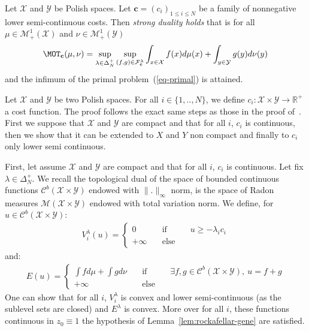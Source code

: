 \begin{thm*}
Let $\mathcal{X}$ and $\mathcal{Y}$ be Polish spaces. Let $\mathbf{c}=(c_i)_{1\leq i\leq N}$ be a family of nonnegative lower semi-continuous costs. Then \emph{strong duality holds} that is for all $\mu\in\mathcal{M}_{+}^{1}(\mathcal{X})$ and $\nu\in\mathcal{M}_{+}^{1}(\mathcal{Y})$ 
\begin{align*}
   \MOT_{\mathbf{c}}(\mu,\nu) =\sup_{\lambda\in\Delta_N^{+}} \sup\limits_{(f,g)\in\mathcal{F}_{\mathbf{c}}^{\lambda}}\int_{x\in\mathcal{X}} f(x)d\mu(x)+ \int_{y\in\mathcal{Y}} g(y)d\nu(y)
\end{align*}
and the infimum of the primal problem~(\ref{eq-primal}) is attained.
\end{thm*}
\begin{prv*}
Let $\mathcal{X}$ and $\mathcal{Y}$ be two Polish spaces. For all $i\in \{1,..,N\}$, we define $c_i:\mathcal{X}\times\mathcal{Y}\rightarrow \mathbb{R}^+$ a cost function. The proof follows the exact same steps as those in the proof of~\citep[Theorem 1.3]{villani2003topics}. First we suppose that $\mathcal{X}$ and $\mathcal{Y}$ are compact and that for all $i$, $c_i$ is continuous, then we show that it can be extended to $X$ and $Y$ non compact and finally to $c_i$ only lower semi continuous.

\medskip
First, let assume $\mathcal{X}$ and $\mathcal{Y}$ are compact and that for all $i$, $c_i$ is continuous. Let fix $\lambda \in\Delta_N^{+}$. We recall the topological dual of the space of bounded continuous functions $\mathcal{C}^b(\mathcal{X}\times\mathcal{Y})$ endowed with $\lVert.\rVert_\infty$ norm, is the space of Radon measures $\mathcal{M}(\mathcal{X}\times\mathcal{Y})$ endowed with total variation norm. We define, for $u\in \mathcal{C}^b(\mathcal{X}\times\mathcal{Y})$:
\begin{align*}
V^\lambda_i(u) =
\left\{\begin{matrix} 0 &\quad\text{if}\quad& u\geq -\lambda_i c_i\\
+\infty &\quad\text{else}\quad&\end{matrix}\right.
\end{align*}
and:
\begin{align*}
E(u)=\left\{\begin{matrix} \int fd\mu+\int gd\nu &\quad\text{if}\quad& \exists f,g\in \mathcal{C}^b(\mathcal{X}\times\mathcal{Y}),~ u = f+g\\
+\infty &\quad\text{else}\quad&\end{matrix}\right.
\end{align*}
One can show that for all $i$, $V^\lambda_i$ is convex and lower semi-continuous (as the sublevel sets are closed) and $E^\lambda$ is convex. More over for all $i$, these functions continuous in $z_0\equiv 1$ the hypothesis of Lemma~\ref{lem:rockafellar-gene} are satisfied.



\end{prv*}
